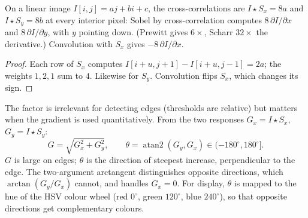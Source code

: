 \begin{notechapter}
\begin{proposition}\label{convolution-filtering:prop:sobel}
On a linear image $I[i,j] = aj + bi + c$, the cross-correlations are $I\star S_x = 8a$ and $I\star S_y = 8b$ at every interior
pixel: Sobel by cross-correlation computes $8\,\partial I/\partial x$ and $8\,\partial I/\partial y$, with $y$ pointing down. (Prewitt gives
$6\times$, Scharr $32\times$ the derivative.) Convolution with $S_x$ gives $-8\,\partial I/\partial x$.
\end{proposition}

\begin{proof}
Each row of $S_x$ computes $I[i + u,j + 1] - I[i + u, j - 1] = 2a$; the weights $1,2,1$ sum to $4$. Likewise for $S_y$.
Convolution flips $S_x$, which changes its sign.
\end{proof}

The factor is irrelevant for detecting edges (thresholds are relative) but matters when
the gradient is used quantitatively. From the two responses $G_x = I\star S_x$, $G_y = I\star S_y$:
\[
  G = \sqrt{G_x^2 + G_y^2},\qquad\theta = \operatorname{atan2}(G_y, G_x)\in(-180^\circ, 180^\circ] .
\]
$G$ is large on edges; $\theta$ is the direction of steepest increase, perpendicular to the edge.
The two-argument arctangent distinguishes opposite directions, which $\arctan(G_y/G_x)$ cannot,
and handles $G_x = 0$. For display, $\theta$ is mapped to the hue of the HSV colour wheel (red $0^\circ$, green
$120^\circ$, blue $240^\circ$), so that opposite directions get complementary colours.


\end{notechapter}
